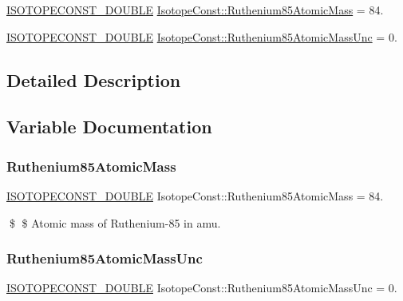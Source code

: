 \begin{DoxyCompactItemize}
\item 
\mbox{\hyperlink{group___isotope_const-_macros_ga8f45a7272ce02c0b4c65c44636ed719a}{I\+S\+O\+T\+O\+P\+E\+C\+O\+N\+S\+T\+\_\+\+D\+O\+U\+B\+LE}} \mbox{\hyperlink{group___isotope_const-_ruthenium-_ru85_ga555da777d027e806822955aae27acd75}{Isotope\+Const\+::\+Ruthenium85\+Atomic\+Mass}} = 84.
\item 
\mbox{\hyperlink{group___isotope_const-_macros_ga8f45a7272ce02c0b4c65c44636ed719a}{I\+S\+O\+T\+O\+P\+E\+C\+O\+N\+S\+T\+\_\+\+D\+O\+U\+B\+LE}} \mbox{\hyperlink{group___isotope_const-_ruthenium-_ru85_ga530bd55e56f9452b2b59266b9545ad12}{Isotope\+Const\+::\+Ruthenium85\+Atomic\+Mass\+Unc}} = 0.
\end{DoxyCompactItemize}


\subsection{Detailed Description}


\subsection{Variable Documentation}
\mbox{\label{group___isotope_const-_ruthenium-_ru85_ga555da777d027e806822955aae27acd75}} 
\subsubsection{\texorpdfstring{Ruthenium85\+Atomic\+Mass}{Ruthenium85AtomicMass}}
{\footnotesize\ttfamily \mbox{\hyperlink{group___isotope_const-_macros_ga8f45a7272ce02c0b4c65c44636ed719a}{I\+S\+O\+T\+O\+P\+E\+C\+O\+N\+S\+T\+\_\+\+D\+O\+U\+B\+LE}} Isotope\+Const\+::\+Ruthenium85\+Atomic\+Mass = 84.}

\$ \$ Atomic mass of Ruthenium-\/85 in amu. \mbox{\label{group___isotope_const-_ruthenium-_ru85_ga530bd55e56f9452b2b59266b9545ad12}} 
\subsubsection{\texorpdfstring{Ruthenium85\+Atomic\+Mass\+Unc}{Ruthenium85AtomicMassUnc}}
{\footnotesize\ttfamily \mbox{\hyperlink{group___isotope_const-_macros_ga8f45a7272ce02c0b4c65c44636ed719a}{I\+S\+O\+T\+O\+P\+E\+C\+O\+N\+S\+T\+\_\+\+D\+O\+U\+B\+LE}} Isotope\+Const\+::\+Ruthenium85\+Atomic\+Mass\+Unc = 0.}


